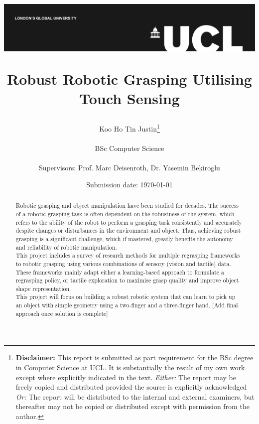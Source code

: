 \documentclass[a4paper]{report}
\title{{\vspace{-14em} \includegraphics[scale=0.4]{ucl_logo.png}}\\
\vspace{2cm}
\begin{adjustwidth}{1cm}{1cm}
    \centering
    \Huge Robust Robotic Grasping Utilising Touch Sensing
\end{adjustwidth}}
\date{Submission date: \today}
\author{Koo Ho Tin Justin\thanks{
{\bf Disclaimer:}
This report is submitted as part requirement for the BSc degree in Computer Science at UCL. It is
substantially the result of my own work except where explicitly indicated in the text.
\emph{Either:} The report may be freely copied and distributed provided the source is explicitly acknowledged
\newline  %
\emph{Or:}\newline
The report will be distributed to the internal and external examiners, but thereafter may not be copied or distributed except with permission from the author.}
\\ \\
BSc Computer Science\\ \\
Supervisors: Prof. Marc Deisenroth, Dr. Yasemin Bekiroglu}
\begin{document}
 
\onehalfspacing
\maketitle


\begin{abstract}
Robotic grasping and object manipulation have been studied for decades. The success of a robotic grasping task is often dependent on the robustness of the system, which refers to the ability of the robot to perform a grasping task consistently and accurately despite changes or disturbances in the environment and object. Thus, achieving robust grasping is a significant challenge, which if mastered, greatly benefits the autonomy and reliability of robotic manipulation.\\

This project includes a survey of research methods for multiple regrasping frameworks to robotic grasping using various combinations of sensory (vision and tactile) data. These frameworks mainly adapt either a learning-based approach to formulate a regrasping policy, or tactile exploration to maximise grasp quality and improve object shape representation.\\

This project will focus on building a robust robotic system that can learn to pick up an object with simple geometry using a two-finger and a three-finger hand. \color{red}[Add final approach once solution is complete]
\end{abstract}


\renewcommand\abstractname{Acknowledgments}
\begin{abstract}
    
\end{abstract}


\tableofcontents
\setcounter{page}{1}


\end{document}
